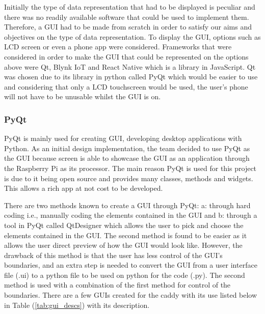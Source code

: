 \documentclass[11pt,landscape]{article}
\begin{document}
\begin{multicols}{3}
Initially the type of data representation that had to be displayed is peculiar
and there was no readily available software that could be used to implement
them. Therefore, a GUI had to be made from scratch in order to satisfy our aims
and objectives on the type of data representation. To display the GUI, options
such as LCD screen or even a phone app were considered. Frameworks that were
considered in order to make the GUI that could be represented on the options
above were Qt, Blynk IoT and React Native which is a library in JavaScript. Qt
was chosen due to its library in python called PyQt which would be easier to use
and considering that only a LCD touchscreen would be used, the user’s phone will
not have to be unusable whilst the GUI is on. 

\subsubsection{PyQt}
PyQt is mainly used for creating GUI, developing desktop applications with
Python. As an initial design implementation, the team decided to use PyQt as the
GUI because screen is able to showcase the GUI as an application through the
Raspberry Pi as its processor. The main reason PyQt is used for this project is
due to it being open source and provides many classes, methods and widgets. This
allows a rich app at not cost to be developed.  

There are two methods known to create a GUI through PyQt: a: through hard coding
i.e., manually coding the elements contained in the GUI and b: through a tool in
PyQt called QtDesigner which allows the user to pick and choose the elements
contained in the GUI. The second method is found to be easier as it allows the
user direct preview of how the GUI would look like. However, the drawback of
this method is that the user has less control of the GUI’s boundaries,
and an extra step is needed to convert the GUI from a user interface file (.ui)
to a python file to be used on python for the code (.py). The second method is
used with a combination of the first method for control of the boundaries. There
are a few GUIs created for the caddy with its use listed below in Table
(\ref{tab:gui_descs}) with its description.


\end{multicols}
\end{document}

